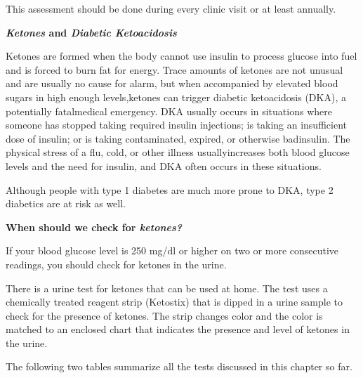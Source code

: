 This assessment should be done during every clinic visit or at least annually.

\noindent\textbf{\textit{Ketones} and \textit{Diabetic Ketoacidosis}}

Ketones are formed when the body cannot use insulin to process glucose into fuel and is forced to burn fat for energy. Trace amounts of ketones are not unusual and are usually no cause for alarm, but when accompanied by elevated blood sugars in high enough levels,\break ketones can trigger diabetic ketoacidosis (DKA), a potentially fatal\break medical emergency. DKA usually occurs in situations where someone has stopped taking required insulin injections; is taking an insufficient dose of insulin; or is taking contaminated, expired, or otherwise bad\break insulin. The physical stress of a flu, cold, or other illness usually\break increases both blood glucose levels and the need for insulin, and DKA often occurs in these situations.

Although people with type 1 diabetes are much more prone to DKA, type 2 diabetics are at risk as well.

\noindent\textbf{When should we check for \textit{ketones?}}

If your blood glucose level is 250 mg/dl or higher on two or more consecutive readings, you should check for ketones in the urine.

There is a urine test for ketones that can be used at home. The test uses a chemically treated reagent strip (Ketostix) that is dipped in a urine sample to check for the presence of ketones. The strip changes color and the color is matched to an enclosed chart that indicates the presence and level of ketones in the urine.


\vskip 10pt

The following two tables summarize all the tests discussed in this chapter so far.

\vskip 8pt

